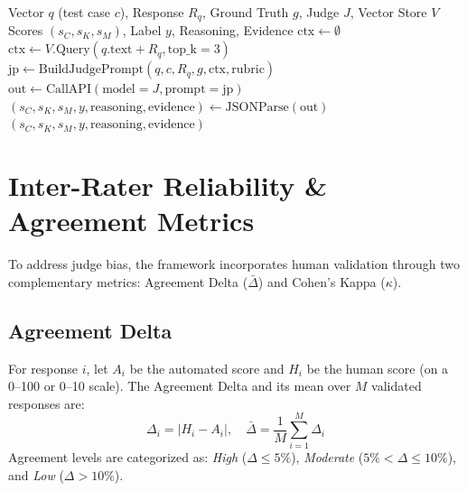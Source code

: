 \documentclass[conference]{IEEEtran}
\begin{document}
\begin{algorithm}[h]
\caption{LLM-as-a-Judge Vector Evaluation}
\label{alg:judge_evaluation}
\begin{algorithmic}[1]
\REQUIRE Vector $q$ (test case $c$), Response $R_q$, Ground Truth $g$, Judge $J$, Vector Store $V$
\ENSURE Scores $(s_C, s_K, s_M)$, Label $y$, Reasoning, Evidence
\STATE $\text{ctx} \leftarrow \emptyset$
    \STATE $\text{ctx} \leftarrow V.\text{Query}(q.\text{text} + R_q, \text{top\_k}=3)$
\ENDIF
\STATE $\text{jp} \leftarrow \text{BuildJudgePrompt}(q, c, R_q, g, \text{ctx}, \text{rubric})$
\STATE $\text{out} \leftarrow \text{CallAPI}(\text{model}=J, \text{prompt}=\text{jp})$
\STATE $(s_C, s_K, s_M, y, \text{reasoning}, \text{evidence}) \leftarrow \text{JSONParse}(\text{out})$
\RETURN $(s_C, s_K, s_M, y, \text{reasoning}, \text{evidence})$
\end{algorithmic}
\end{algorithm}

\section{Inter-Rater Reliability \& Agreement Metrics}
\label{sec:inter_rater_reliability}

To address judge bias, the framework incorporates human validation through two complementary metrics: Agreement Delta ($\bar{\Delta}$) and Cohen's Kappa ($\kappa$).

\subsection{Agreement Delta}
For response $i$, let $A_i$ be the automated score and $H_i$ be the human score (on a 0--100 or 0--10 scale). The Agreement Delta and its mean over $M$ validated responses are:
\begin{equation}
    \Delta_i = |H_i - A_i|, \quad \bar{\Delta} = \frac{1}{M} \sum_{i=1}^M \Delta_i
    \label{eq:agreement_delta}
\end{equation}
Agreement levels are categorized as: \emph{High} ($\Delta \le 5\%$), \emph{Moderate} ($5\% < \Delta \le 10\%$), and \emph{Low} ($\Delta > 10\%$).
\end{document}
